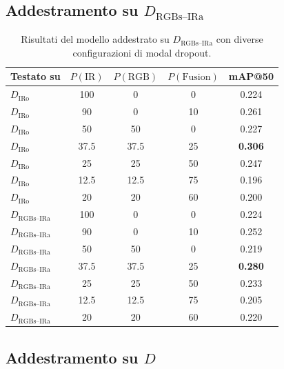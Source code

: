\documentclass[a4paper,11pt]{article}
\begin{document}
\subsection*{Addestramento su $D_{\text{RGBs--IRa}}$}

\begin{table}[h]
\centering
\caption{Risultati del modello addestrato su $D_{\text{RGBs--IRa}}$ con diverse configurazioni di modal dropout.}
\label{tab:rgbir_train}
\begin{tabular}{lcccc}
\toprule
Testato su & $P(\text{IR})$ & $P(\text{RGB})$ & $P(\text{Fusion})$ & mAP@50 \\
\midrule
$D_{\text{IRo}}$ & 100 & 0 & 0 & 0.224 \\
$D_{\text{IRo}}$ & 90 & 0 & 10 & 0.261 \\
$D_{\text{IRo}}$ & 50 & 50 & 0 & 0.227 \\
$D_{\text{IRo}}$ & 37.5 & 37.5 & 25 & \textbf{0.306} \\
$D_{\text{IRo}}$ & 25 & 25 & 50 & 0.247 \\
$D_{\text{IRo}}$ & 12.5 & 12.5 & 75 & 0.196 \\
$D_{\text{IRo}}$ & 20 & 20 & 60 & 0.200 \\
\midrule
$D_{\text{RGBs--IRa}}$ & 100 & 0 & 0 & 0.224 \\
$D_{\text{RGBs--IRa}}$ & 90 & 0 & 10 & 0.252 \\
$D_{\text{RGBs--IRa}}$ & 50 & 50 & 0 & 0.219 \\
$D_{\text{RGBs--IRa}}$ & 37.5 & 37.5 & 25 & \textbf{0.280} \\
$D_{\text{RGBs--IRa}}$ & 25 & 25 & 50 & 0.233 \\
$D_{\text{RGBs--IRa}}$ & 12.5 & 12.5 & 75 & 0.205 \\
$D_{\text{RGBs--IRa}}$ & 20 & 20 & 60 & 0.220 \\
\bottomrule
\end{tabular}
\end{table}

\subsection*{Addestramento su $D$}
\end{document}
